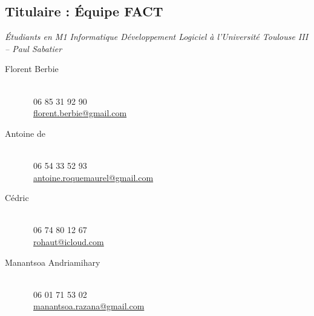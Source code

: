 	\subsection{Titulaire : Équipe FACT}
	\textit{Étudiants en M1 Informatique Développement Logiciel à l'Université Toulouse III -- Paul Sabatier}
	\begin{description}
		\item[Florent Berbie]~ \\
	\Telefon~06 85 31 92 90 \\
	\Letter~\href{mailto:florent.berbie@gmail.com}{florent.berbie@gmail.com} \\
	
\item[Antoine de ] ~\\
	\Telefon~06 54 33 52 93\\
	\Letter~\href{mailto:antoine.roquemaurel@gmail.com}{antoine.roquemaurel@gmail.com} \\
	
\item[Cédric ]~\\ 
	\Telefon~06 74 80 12 67\\
	\Letter~\href{mailto:rohaut@icloud.com}{rohaut@icloud.com} \\
	
\item[Manantsoa Andriamihary ] ~\\
	\Telefon~06 01 71 53 02\\
	\Letter~\href{mailto:manantsoa.razana@gmail.com}{manantsoa.razana@gmail.com}
\end{description}



